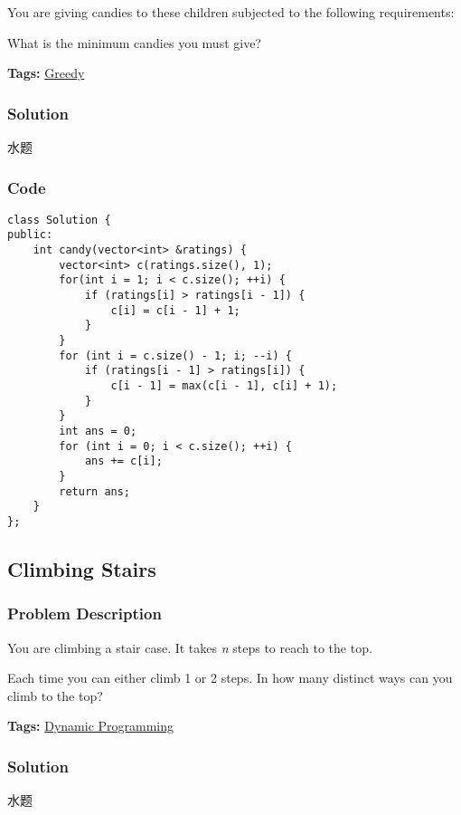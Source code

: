 \documentclass{article}
\begin{document}
\begin{CJK*}{UTF8}{gkai}
You are giving candies to these children subjected to the following requirements:

What is the minimum candies you must give?


\textbf{Tags: }
\hyperref[ Greedy ]{ Greedy }



\subsubsection*{Solution}
水题

\subsubsection*{Code}
\begin{lstlisting}
class Solution {
public:
    int candy(vector<int> &ratings) {
        vector<int> c(ratings.size(), 1);
        for(int i = 1; i < c.size(); ++i) {
            if (ratings[i] > ratings[i - 1]) {
                c[i] = c[i - 1] + 1;
            }
        }
        for (int i = c.size() - 1; i; --i) {
            if (ratings[i - 1] > ratings[i]) {
                c[i - 1] = max(c[i - 1], c[i] + 1);
            }
        }
        int ans = 0;
        for (int i = 0; i < c.size(); ++i) {
            ans += c[i];
        }
        return ans;
    }
}; 
\end{lstlisting}


\subsection{ Climbing Stairs }
\label{ Climbing Stairs }

\subsubsection*{Problem Description}
You are climbing a stair case. It takes \emph{n} steps to reach to the top.

Each time you can either climb 1 or 2 steps. In how many distinct ways can you climb to the top?


\textbf{Tags: }
\hyperref[ Dynamic Programming ]{ Dynamic Programming }



\subsubsection*{Solution}
水题


\end{CJK*}
\end{document}
